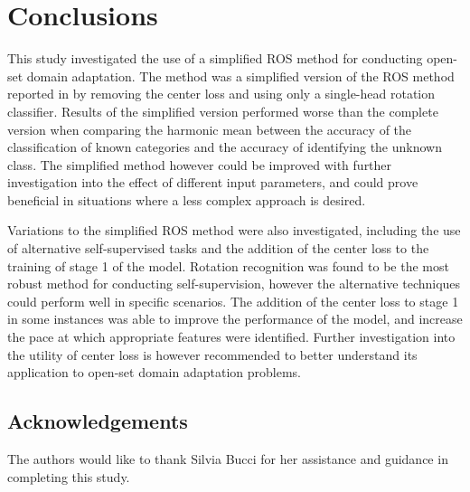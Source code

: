 \documentclass[10pt,twocolumn,letterpaper]{article}
\begin{document}
\section{Conclusions}
\label{sec:conclusion}

This study investigated the use of a simplified ROS method for conducting open-set domain adaptation. The method was a simplified version of the ROS method reported in \cite{Bucci2020} by removing the center loss and using only a single-head rotation classifier. Results of the simplified version performed worse than the complete version when comparing the harmonic mean between the accuracy of the classification of known categories and the accuracy of identifying the unknown class. The simplified method however could be improved with further investigation into the effect of different input parameters, and could prove beneficial in situations where a less complex approach is desired. 

Variations to the simplified ROS method were also investigated, including the use of alternative self-supervised tasks and the addition of the center loss to the training of stage 1 of the model. Rotation recognition was found to be the most robust method for conducting self-supervision, however the alternative techniques could perform well in specific scenarios.  The addition of the center loss to stage 1 in some instances was able to improve the performance of the model, and increase the pace at which appropriate features were identified. Further investigation into the utility of center loss is however recommended to better understand its application to open-set domain adaptation problems.


\subsection{Acknowledgements}
The authors would like to thank Silvia Bucci for her assistance and guidance in completing this study.


{\small


}
\end{document}
